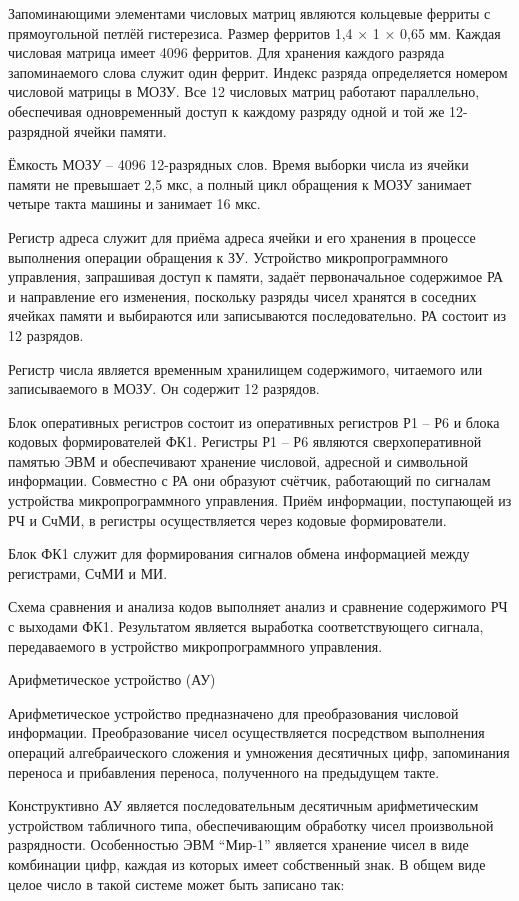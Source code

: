 \documentclass[11pt]{article}
\begin{document}
Запоминающими элементами числовых
матриц являются кольцевые ферриты с
прямоугольной петлёй гистерезиса.
Размер ферритов 1,4 × 1 × 0,65 мм. Каждая
числовая матрица имеет 4096 ферритов. Для
хранения каждого разряда
запоминаемого слова служит один
феррит. Индекс разряда определяется
номером числовой матрицы в МОЗУ. Все 12
числовых матриц работают параллельно,
обеспечивая одновременный доступ к
каждому разряду одной и той же
12-разрядной ячейки памяти.

Ёмкость МОЗУ – 4096 12-разрядных слов.
Время выборки числа из ячейки памяти не
превышает 2,5 мкс, а полный цикл
обращения к МОЗУ занимает четыре такта
машины и занимает 16 мкс.

Регистр адреса служит для приёма
адреса ячейки и его хранения в процессе
выполнения операции обращения к ЗУ.
Устройство микропрограммного
управления, запрашивая доступ к памяти,
задаёт первоначальное содержимое РА и
направление его изменения, поскольку
разряды чисел хранятся в соседних
ячейках памяти и выбираются или
записываются последовательно. РА
состоит из 12 разрядов.

Регистр числа является временным
хранилищем содержимого, читаемого или
записываемого в МОЗУ. Он содержит 12
разрядов.

Блок оперативных регистров состоит из
оперативных регистров Р1 – Р6 и блока
кодовых формирователей ФК1. Регистры Р1
– Р6 являются сверхоперативной памятью
ЭВМ и обеспечивают хранение числовой,
адресной и символьной информации.
Совместно с РА они образуют счётчик,
работающий по сигналам устройства
микропрограммного управления. Приём
информации, поступающей из РЧ и СчМИ, в
регистры осуществляется через кодовые
формирователи.

Блок ФК1 служит для формирования
сигналов обмена информацией между
регистрами, СчМИ и МИ.

Схема сравнения и анализа кодов
выполняет анализ и сравнение
содержимого РЧ с выходами ФК1.
Результатом является выработка
соответствующего сигнала,
передаваемого в устройство
микропрограммного управления.

Арифметическое устройство (АУ)

Арифметическое устройство
предназначено для преобразования
числовой информации. Преобразование
чисел осуществляется посредством
выполнения операций алгебраического
сложения и умножения десятичных цифр,
запоминания переноса и прибавления
переноса, полученного на предыдущем
такте.

Конструктивно АУ является
последовательным десятичным
арифметическим устройством табличного
типа, обеспечивающим обработку чисел
произвольной разрядности.
Особенностью ЭВМ “Мир-1” является
хранение чисел в виде комбинации цифр,
каждая из которых имеет собственный
знак. В общем виде целое число в такой
системе может быть записано так:
\end{document}
